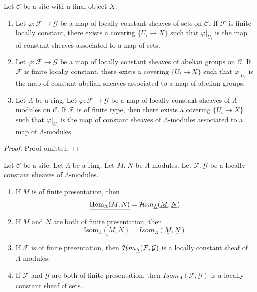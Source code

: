 \begin{lemma}
\label{lemma-morphism-locally-constant}
Let $\mathcal{C}$ be a site with a final object $X$.
\begin{enumerate}
\item Let $\varphi : \mathcal{F} \to \mathcal{G}$ be a map
of locally constant sheaves of sets on $\mathcal{C}$.
If $\mathcal{F}$ is finite locally constant, there exists a
covering $\{U_i \to X\}$ such that
$\varphi|_{U_i}$ is the map of constant sheaves associated to
a map of sets.
\item Let $\varphi : \mathcal{F} \to \mathcal{G}$ be a map
of locally constant sheaves of abelian groups on $\mathcal{C}$.
If $\mathcal{F}$ is finite locally constant, there exists a
covering $\{U_i \to X\}$ such that $\varphi|_{U_i}$ is the map of
constant abelian sheaves associated to a map of abelian groups.
\item Let $\Lambda$ be a ring.
Let $\varphi : \mathcal{F} \to \mathcal{G}$ be a map
of locally constant sheaves of $\Lambda$-modules on $\mathcal{C}$.
If $\mathcal{F}$ is of finite type, then there exists a covering
$\{U_i \to X\}$ such that $\varphi|_{U_i}$ is the map of constant
sheaves of $\Lambda$-modules associated to a map of $\Lambda$-modules.
\end{enumerate}
\end{lemma}

\begin{proof}
Proof omitted.
\end{proof}

\begin{lemma}
\label{lemma-locally-constant}
Let $\mathcal{C}$ be a site. Let $\Lambda$ be a ring.
Let $M$, $N$ be $\Lambda$-modules.
Let $\mathcal{F}, \mathcal{G}$ be a locally constant sheaves of
$\Lambda$-modules.
\begin{enumerate}
\item If $M$ is of finite presentation, then
$$
\underline{\mathop{\mathrm{Hom}}\nolimits_\Lambda(M, N)} =
\mathop{\mathcal{H}\!\mathit{om}}\nolimits_{\underline{\Lambda}}(\underline{M}, \underline{N})
$$
\item If $M$ and $N$ are both of finite presentation, then
$$
\underline{\text{Isom}_\Lambda(M, N)} =
\mathit{Isom}_{\underline{\Lambda}}(\underline{M}, \underline{N})
$$
\item If $\mathcal{F}$ is of finite presentation, then
$\mathop{\mathcal{H}\!\mathit{om}}\nolimits_{\underline{\Lambda}}(\mathcal{F}, \mathcal{G})$
is a locally constant sheaf of $\Lambda$-modules.
\item If $\mathcal{F}$ and $\mathcal{G}$ are both of finite presentation, then
$\mathit{Isom}_{\underline{\Lambda}}(\mathcal{F}, \mathcal{G})$
is a locally constant sheaf of sets.
\end{enumerate}
\end{lemma}

